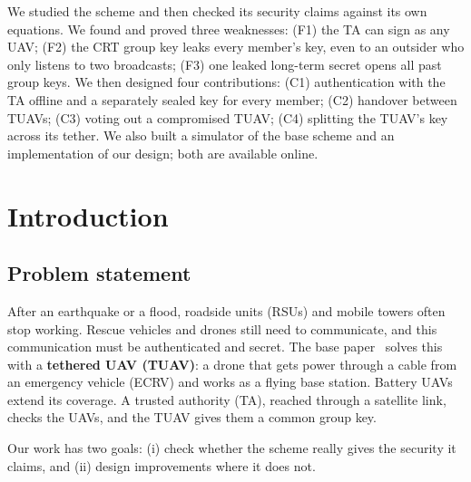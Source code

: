 \documentclass[11pt,openany]{report}
\begin{document}
We studied the scheme and then checked its security claims against its own equations. We found and proved three weaknesses: (F1) the TA can sign as
any UAV; (F2) the CRT group key leaks every member's key, even to an outsider who only listens to two broadcasts; (F3) one leaked long-term secret
opens all past group keys. We then designed four contributions: (C1) authentication with the TA offline and a separately sealed key for every
member; (C2) handover between TUAVs; (C3) voting out a compromised TUAV; (C4) splitting the TUAV's key across its tether. We also built a simulator
of the base scheme and an implementation of our design; both are available online.

\tableofcontents
\listoffigures
\clearpage

\chapter{Introduction}
\section{Problem statement}
After an earthquake or a flood, roadside units (RSUs) and mobile towers often stop working. Rescue vehicles and drones still need to communicate, and
this communication must be authenticated and secret. The base paper~\cite{tan2023} solves this with a \textbf{tethered UAV (TUAV)}: a drone that gets
power through a cable from an emergency vehicle (ECRV) and works as a flying base station. Battery UAVs extend its coverage. A trusted authority (TA),
reached through a satellite link, checks the UAVs, and the TUAV gives them a common group key.

Our work has two goals: (i) check whether the scheme really gives the security it claims, and (ii) design improvements where it does not.
\end{document}
